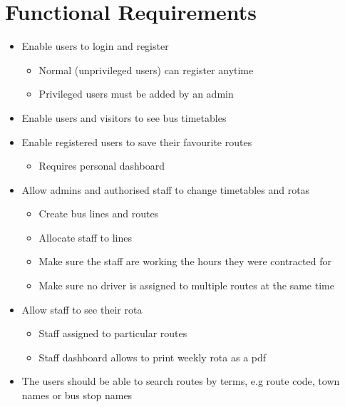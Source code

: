 \section{Functional Requirements}

\begin{itemize}
  \item Enable users to login and register
    \begin{itemize}
      \item Normal (unprivileged users) can register anytime
      \item Privileged users must be added by an admin
    \end{itemize}
  \item Enable users and visitors to see bus timetables
  \item Enable registered users to save their favourite routes
    \begin{itemize}
      \item Requires personal dashboard
    \end{itemize}
  \item Allow admins and authorised staff to change timetables and rotas
    \begin{itemize}
      \item Create bus lines and routes
      \item Allocate staff to lines
      \item Make sure the staff are working the hours they were contracted for
      \item Make sure no driver is assigned to multiple routes at the same time
    \end{itemize}
  \item Allow staff to see their rota
    \begin{itemize}
      \item Staff assigned to particular routes
      \item Staff dashboard allows to print weekly rota as a pdf
    \end{itemize}
  \item The users should be able to search routes by terms, e.g route code, town names or bus stop names
\end{itemize}
